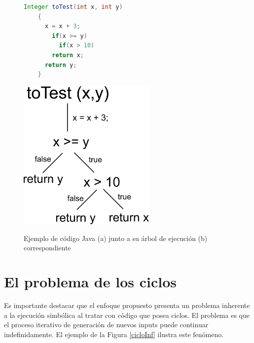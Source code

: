 \documentclass{llncs}
\begin{document}
\begin{figure}[hbt!]
  \centering
    \begin{minipage}[b]{.5\textwidth}
      \begin{lstlisting}[language=Java]
	Integer toTest(int x, int y)
	{
	  x = x + 3;
	    if(x >= y) 
	      if(x > 10) 
		return x;
	  return y;
	}
      \end{lstlisting}
    \end{minipage}
  \begin{minipage}[b]{0.45\textwidth}
    \centering
    \includegraphics[width=0.6\textwidth]{arbolEjecucion}\\
  \end{minipage}
  \caption{Ejemplo de código Java (a) junto a su árbol de ejecución (b) correspondiente}
  \label{arbolEjecucion}
\end{figure}


\section{El problema de los ciclos}\label{sec:loopProblem}
Es importante destacar que el enfoque propuesto presenta un problema inherente a la ejecución simbólica al tratar con código que posea ciclos. El problema es que el proceso iterativo de generación de nuevos inputs puede continuar indefinidamente. El ejemplo de la Figura \ref{cicloInf} ilustra este fenómeno.
\end{document}
